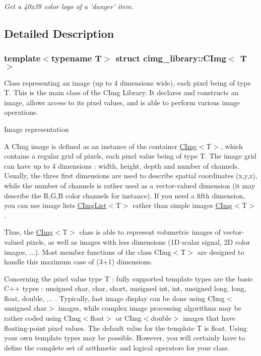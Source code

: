 \begin{DoxyCompactItemize}
\begin{DoxyCompactList}\small\item\em Get a 40x38 color logo of a 'danger' item. \item\end{DoxyCompactList}\end{DoxyCompactItemize}


\subsection{Detailed Description}
\subsubsection*{template$<$typename T$>$ struct cimg\_\-library::CImg$<$ T $>$}

Class representing an image (up to 4 dimensions wide), each pixel being of type {\ttfamily T}. This is the main class of the CImg Library. It declares and constructs an image, allows access to its pixel values, and is able to perform various image operations.

\begin{DoxyParagraph}{Image representation}

\end{DoxyParagraph}
A CImg image is defined as an instance of the container \hyperlink{structcimg__library_1_1_c_img}{CImg}$<$T$>$, which contains a regular grid of pixels, each pixel value being of type {\ttfamily T}. The image grid can have up to 4 dimensions : width, height, depth and number of channels. Usually, the three first dimensions are used to describe spatial coordinates {\ttfamily (x,y,z)}, while the number of channels is rather used as a vector-\/valued dimension (it may describe the R,G,B color channels for instance). If you need a fifth dimension, you can use image lists \hyperlink{structcimg__library_1_1_c_img_list}{CImgList}$<$T$>$ rather than simple images \hyperlink{structcimg__library_1_1_c_img}{CImg}$<$T$>$.

Thus, the \hyperlink{structcimg__library_1_1_c_img}{CImg}$<$T$>$ class is able to represent volumetric images of vector-\/valued pixels, as well as images with less dimensions (1D scalar signal, 2D color images, ...). Most member functions of the class CImg$<$T$>$ are designed to handle this maximum case of (3+1) dimensions.

Concerning the pixel value type {\ttfamily T} : fully supported template types are the basic C++ types : {\ttfamily unsigned char, char, short, unsigned int, int, unsigned long, long, float, double, ... }. Typically, fast image display can be done using {\ttfamily CImg$<$unsigned char$>$} images, while complex image processing algorithms may be rather coded using {\ttfamily CImg$<$float$>$} or {\ttfamily CImg$<$double$>$} images that have floating-\/point pixel values. The default value for the template T is {\ttfamily float}. Using your own template types may be possible. However, you will certainly have to define the complete set of arithmetic and logical operators for your class.

